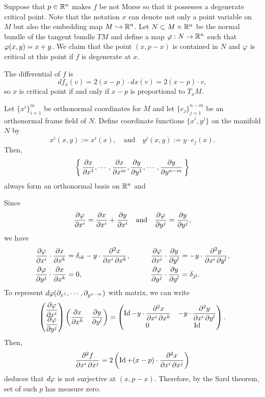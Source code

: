 \documentclass{../exp}
\begin{document}
\begin{pf}
Suppose that $p\in\mathbb{R}^n$ makes $f$ be not Morse so that it possesses a degenerate critical point.
Note that the notation $x$ can denote not only a point variable on $M$ but also the embedding map $M\hookrightarrow\mathbb{R}^n$.
Let $N\subset M\times\mathbb{R}^n$ be the normal bundle of the tangent bundle $TM$ and define a map $\varphi:N\to\mathbb{R}^n$ such that $\varphi(x,y)=x+y$.
We claim that the point $(x,p-x)$ is contained in $N$ and $\varphi$ is critical at this point if $f$ is degenerate at $x$.

The differential of $f$ is
\[df_x(v)=2(x-p)\cdot dx(v)=2(x-p)\cdot v,\]
so $x$ is critical point if and only if $x-p$ is proportional to $T_xM$.

Let $\{x^i\}_{i=1}^m$ be orthonormal coordinates for $M$ and let $\{e_j\}_{j=1}^{n-m}$ be an orthonormal frame field of $N$.
Define coordinate functions $\{x^i,y^j\}$ on the manifold $N$ by
\[x^i(x,y):=x^i(x),\quad\text{and}\quad y^j(x,y):=y\cdot e_j(x).\]
Then,
\[\left\{\,\pd{x}{x^1},\cdots,\pd{x}{x^m},\pd{y}{y^1},\cdots,\pd{y}{y^{n-m}}\,\right\}\]
always form an orthonormal basis on $\mathbb{R}^n$ and

Since
\[\pd{\f}{x^i}=\pd{x}{x^i}+\pd{y}{x^i}\quad\text{and}\quad\pd{\f}{y^j}=\pd{y}{y^j},\]
we have
\begin{alignat*}{2}
\pd{\f}{x^i}\cdot\pd{x}{x^k}&=\delta_{ik}-y\cdot\pd{x}{x^i}{x^k},\qquad&
\pd{\f}{x^i}\cdot\pd{y}{y^l}&=-y\cdot\pd{y}{x^i}{y^l},\\
\pd{\f}{y^j}\cdot\pd{x}{x^k}&=0,&
\pd{\f}{y^j}\cdot\pd{y}{y^l}&=\delta_{jl}.
\end{alignat*}
To represent $d\f(\pd_{x^1},\cdots,\pd_{y^{n-m}})$ with matrix, we can write
\[\begin{pmatrix}\displaystyle\pd{\f}{x^i}\\\displaystyle\pd{\f}{y^j}\end{pmatrix}
\begin{pmatrix}\displaystyle\pd{x}{x^k}&\displaystyle\pd{y}{y^l}\end{pmatrix}
=\begin{pmatrix}\displaystyle\Id-y\cdot\pd{x}{x^i}{x^k}&\displaystyle-y\cdot\pd{y}{x^i}{y^l}\\0&\Id\end{pmatrix}.\]
Then,
\[\pd{f}{x^i}{x^j}=2\left(\Id+(x-p)\cdot\pd{x}{x^i}{x^j}\right)\]
deduces that $d\varphi$ is not surjective at $(x,p-x)$.
Therefore, by the Sard theorem, set of such $p$ has measure zero.
\end{pf}
\end{document}

